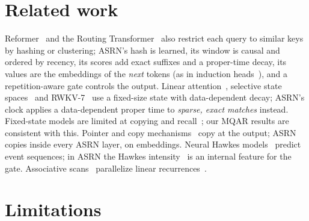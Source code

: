 \documentclass[11pt]{article}
\begin{document}
\section{Related work}

Reformer~\cite{kitaev2020reformer} and the Routing Transformer~\cite{roy2021routing} also restrict each query to similar
keys by hashing or clustering; ASRN's hash is learned, its window is causal and ordered by recency, its scores add exact
suffixes and a proper-time decay, its values are the embeddings of the \emph{next} tokens (as in induction
heads~\cite{olsson2022induction}), and a repetition-aware gate controls the output. Linear
attention~\cite{katharopoulos2020transformers}, selective state spaces~\cite{gu2023mamba,dao2024transformers} and
RWKV-7~\cite{peng2025rwkv7} use a fixed-size state with data-dependent decay; ASRN's clock applies a data-dependent
proper time to \emph{sparse, exact matches} instead. Fixed-state models are limited at copying and
recall~\cite{jelassi2024repeat,arora2023zoology}; our MQAR results are consistent with this. Pointer and copy
mechanisms~\cite{vinyals2015pointer,gu2016copynet,see2017pointergen,merity2016pointer} copy at the output; ASRN copies
inside every ASRN layer, on embeddings. Neural Hawkes models~\cite{mei2017neural,zuo2020transformer} predict event
sequences; in ASRN the Hawkes intensity~\cite{hawkes1971spectra} is an internal feature for the gate. Associative
scans~\cite{blelloch1990prefix} parallelize linear recurrences~\cite{martin2018parallelizing,smith2023s5}.

\section{Limitations}
\label{sec:limitations}
\end{document}
